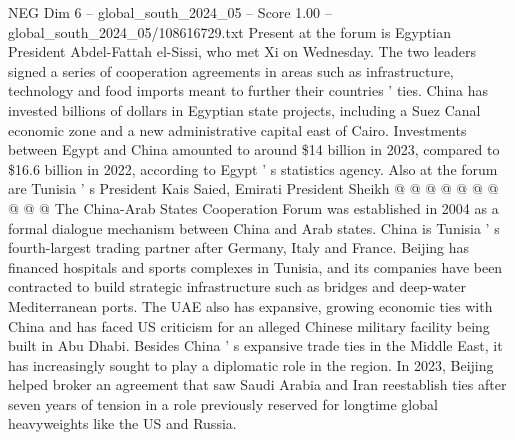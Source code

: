 \begin{textsample}{NEG Dim 6 – global\_south\_2024\_05 – Score 1.00 – global\_south\_2024\_05/108616729.txt}
Present at the forum is Egyptian President Abdel-Fattah el-Sissi, who met Xi on Wednesday.
The two leaders signed a series of cooperation agreements in areas such as infrastructure, technology and food imports meant to further their countries ' ties.
China has invested billions of dollars in Egyptian state projects, including a Suez Canal economic zone and a new administrative capital east of Cairo.
Investments between Egypt and China amounted to around \$14 billion in 2023, compared to \$16.6 billion in 2022, according to Egypt ' s statistics agency.
Also at the forum are Tunisia ' s President Kais Saied, Emirati President Sheikh @ @ @ @ @ @ @ @ @ @ The China-Arab States Cooperation Forum was established in 2004 as a formal dialogue mechanism between China and Arab states.
China is Tunisia ' s fourth-largest trading partner after Germany, Italy and France.
Beijing has financed hospitals and sports complexes in Tunisia, and its companies have been contracted to build strategic infrastructure such as bridges and deep-water Mediterranean ports.
The UAE also has expansive, growing economic ties with China and has faced US criticism for an alleged Chinese military facility being built in Abu Dhabi.
Besides China ' s expansive trade ties in the Middle East, it has increasingly sought to play a diplomatic role in the region.
In 2023, Beijing helped broker an agreement that saw Saudi Arabia and Iran reestablish ties after seven years of tension in a role previously reserved for longtime global heavyweights like the US and Russia.

\end{textsample}
